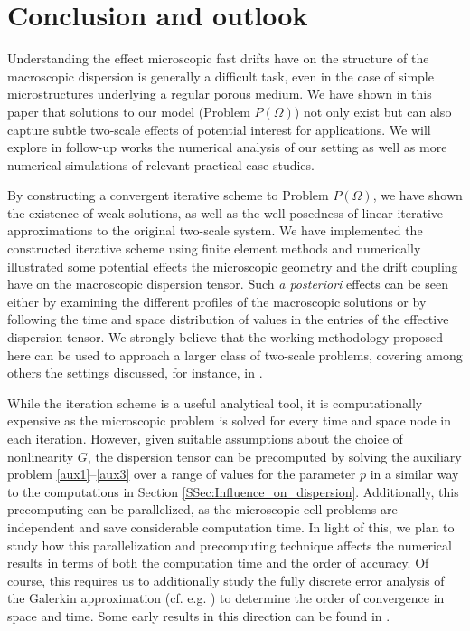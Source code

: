 \documentclass[11pt]{article}
\begin{document}
\newpage
\section{Conclusion and outlook}\label{section_conclusion}
Understanding the effect microscopic fast drifts have on the structure of the macroscopic dispersion is generally a difficult task, even in the case of simple microstructures underlying a regular porous medium. 
We have shown in this paper that solutions to our model (Problem $P(\Omega)$) not only exist but can also capture subtle two-scale effects of potential interest for applications. 
We will explore in follow-up works the numerical analysis of our setting as well as more numerical simulations of relevant practical case studies. 

By constructing a convergent iterative scheme to Problem $P(\Omega)$, we have shown the existence of weak solutions, as well as the well-posedness of linear iterative approximations to the original two-scale system. 
We have implemented the constructed iterative scheme using finite element methods and numerically illustrated some potential effects the microscopic geometry and the drift coupling have on the macroscopic dispersion tensor. 
Such {\em a posteriori} effects can be seen either by examining the different profiles of the macroscopic solutions or by following the time and space distribution of values in the entries of the effective dispersion tensor.  
We strongly believe that the working methodology proposed here can be used to approach a larger class of two-scale problems, covering among others the settings discussed, for instance, in
\cite{marusik2005,allaire2016,ijioma2019fast,raveendran2022upscaling}.

While the iteration scheme is a useful analytical tool, it is computationally expensive as the microscopic problem is solved for every time and space node in each iteration. 
However, given suitable assumptions about the choice of nonlinearity $G$, the dispersion tensor can be precomputed by solving the auxiliary problem \eqref{aux1}--\eqref{aux3} over a range of values for the parameter $p$ in a similar way to the computations in Section \ref{SSec:Influence_on_dispersion}.
Additionally, this precomputing can be parallelized, as the microscopic cell problems are independent and save considerable computation time. 
In light of this, we plan to study how this parallelization and precomputing technique affects the numerical results in terms of both the computation time and the order of accuracy. 
Of course, this requires us to additionally study the fully discrete error analysis of the Galerkin approximation (cf. e.g. \cite{lind2020semidiscrete, nepal2023analysis}) to determine the order of convergence in space and time.
Some early results in this direction can be found in \cite{nepal2024numerical}.
\end{document}
